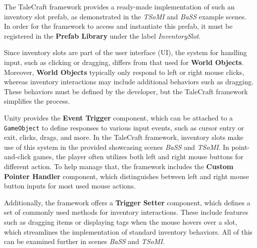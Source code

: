 The TaleCraft framework provides a ready-made implementation of such an inventory slot prefab, as demonstrated in the \textit{TSoMI} and \textit{BaSS} example scenes. In order for the framework to access and instantiate this prefab, it must be registered in the \textbf{Prefab Library} under the label \textit{InventorySlot}.

Since inventory slots are part of the user interface (UI), the system for handling input, such as clicking or dragging, differs from that used for \textbf{World Objects}. Moreover, \textbf{World Objects} typically only respond to left or right mouse clicks, whereas inventory interactions may include additional behaviors such as dragging. These behaviors must be defined by the developer, but the TaleCraft framework simplifies the process.

Unity provides the \textbf{Event Trigger} component, which can be attached to a \verb|GameObject| to define responses to various input events, such as cursor entry or exit, clicks, drags, and more. In the TaleCraft framework, inventory slots make use of this system in the provided showcasing scenes \textit{BaSS} and \textit{TSoMI}. In point-and-click games, the player often utilizes both left and right mouse buttons for different action. To help manage that, the framework includes the \textbf{Custom Pointer Handler} component, which distinguishes between left and right mouse button inputs for most used mouse actions.

Additionally, the framework offers a \textbf{Trigger Setter} component, which defines a set of commonly used methods for inventory interactions. These include features such as dragging items or displaying tags when the mouse hovers over a slot, which streamlines the implementation of standard inventory behaviors. All of this can be examined further in scenes \textit{BaSS} and \textit{TSoMI}.

